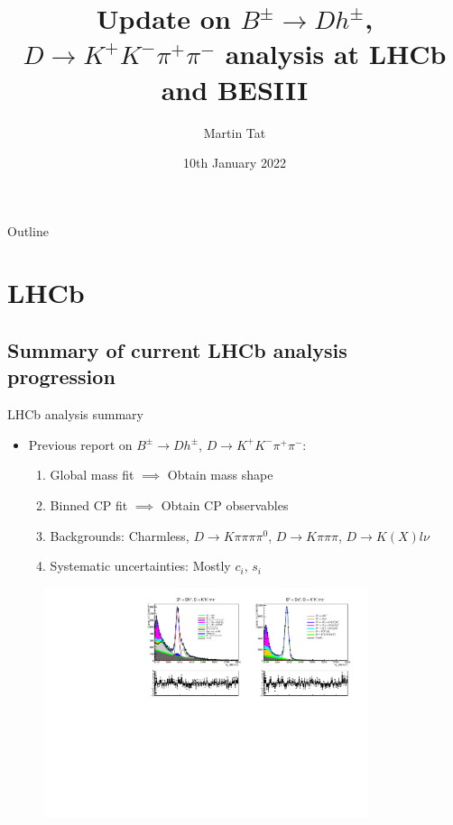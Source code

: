 \documentclass{beamer}
\title[$K^+K^-\pi^+\pi^-$]{Update on \texorpdfstring{$B^\pm\to Dh^\pm$}{B to Dh}, \texorpdfstring{$D\to K^+K^-\pi^+\pi^-$}{K+K-pi+pi-} analysis at LHCb and BESIII}
\author{Martin Tat}
\institute{Oxford LHCb}
\date{10th January 2022}
\begin{document}
\begin{frame}
  \titlepage
\end{frame}

\begin{frame}{Outline}
  \tableofcontents
\end{frame}

\section{LHCb}
\subsection{Summary of current LHCb analysis progression}

\begin{frame}{LHCb analysis summary}
  \begin{itemize}
    \setlength\itemsep{0.5em}
    \item{Previous report on $B^\pm\to Dh^\pm$, $D\to K^+K^-\pi^+\pi^-$:}
    \begin{enumerate}
      \setlength\itemsep{0.5em}
      \item{Global mass fit $\implies$ Obtain mass shape}
      \item{Binned CP fit $\implies$ Obtain CP observables}
      \item{Backgrounds: Charmless, $D\to K\pi\pi\pi\pi^0$, $D\to K\pi\pi\pi$, $D\to K(X)l\nu$}
      \item{Systematic uncertainties: Mostly $c_i$, $s_i$}
    \end{enumerate}
  \end{itemize}
  \begin{figure}
    \includegraphics[width = 0.85\textwidth]{Plots/d2kkpipi_fiveL_allDP.pdf}
  \end{figure}
\end{frame}
\end{document}
